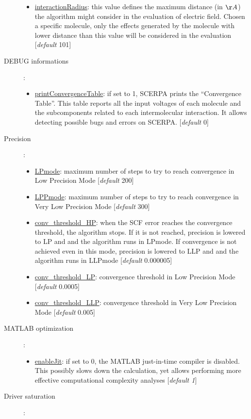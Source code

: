 \documentclass[a4paper,10pt]{article}
\begin{document}
\begin{description}
\begin{itemize}
	\item \underline{interactionRadius}: this value defines the maximum distance (in $\AA$) the algorithm might consider in the evaluation of electric field. Chosen a specific molecule, only the effects generated by the molecule with lower distance than this value will be considered in the evaluation [\textit{default} 101] 
	\end{itemize}
\item[DEBUG informations]:
	\begin{itemize}
	\item \underline{printConvergenceTable}: if set to 1, SCERPA prints the \enquote{Convergence Table}. This table reports all the input voltages of each molecule and the subcomponents related to each intermolecular interaction. It allows detecting possible bugs and errors on SCERPA. [\textit{default} 0] 
	\end{itemize}
\item[Precision]:
	\begin{itemize}
	\item \underline{LPmode}: maximum number of steps to try to reach convergence in Low Precision Mode [\textit{default} 200] 
	\item \underline{LPPmode}: maximum number of steps to try to reach convergence in Very Low Precision Mode [\textit{default} 300] 
	\item \underline{conv\_threshold\_HP}: when the SCF error reaches the convergence threshold, the algorithm stops. If it is not reached, precision is lowered to LP and and the algorithm runs in LPmode. If convergence is not achieved even in this mode, precision is lowered to LLP and and the algorithm runs in LLPmode [\textit{default} 0.000005] 
	\item \underline{conv\_threshold\_LP}: convergence threshold in Low Precision Mode [\textit{default} 0.0005] 
	\item \underline{conv\_threshold\_LLP}: convergence threshold in Very Low Precision Mode [\textit{default} 0.005] 
	\end{itemize}
\item[MATLAB optimization]:
	\begin{itemize}
	\item \underline{enableJit}: if set to 0, the MATLAB just-in-time compiler is disabled. This possibly slows down the calculation, yet allows performing more effective computational complexity analyses [\textit{default 1}] 
	\end{itemize}
\item[Driver saturation]:

\end{description}
\end{document}
